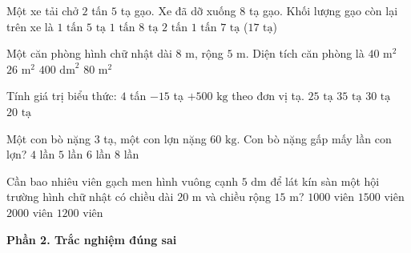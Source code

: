 \begin{ex} %
Một xe tải chở $2$ tấn $5$ tạ gạo. Xe đã dỡ xuống $8$ tạ gạo. Khối lượng gạo còn lại trên xe là
\choice
{$1\text{ tấn } 5\text{ tạ}$}
{$1\text{ tấn } 8\text{ tạ}$}
{$2\text{ tấn}$}
{\True $1\text{ tấn } 7\text{ tạ}$ ($17\text{ tạ}$)}
\end{ex}

\begin{ex} %
Một căn phòng hình chữ nhật dài $8\text{ m}$, rộng $5\text{ m}$. Diện tích căn phòng là
\choice
{\True $40\text{ m}^2$}
{$26\text{ m}^2$}
{$400\text{ dm}^2$}
{$80\text{ m}^2$}
\end{ex}

\begin{ex} %
Tính giá trị biểu thức: $4$ tấn $- 15$ tạ $+ 500\text{ kg}$ theo đơn vị tạ.
\choice
{$25\text{ tạ}$}
{$35\text{ tạ}$}
{\True $30\text{ tạ}$}
{$20\text{ tạ}$}
\end{ex}

\begin{ex} %
Một con bò nặng $3$ tạ, một con lợn nặng $60\text{ kg}$. Con bò nặng gấp mấy lần con lợn?
\choice
{$4$ lần}
{\True $5$ lần}
{$6$ lần}
{$8$ lần}
\end{ex}

\begin{ex} %
Cần bao nhiêu viên gạch men hình vuông cạnh $5\text{ dm}$ để lát kín sàn một hội trường hình chữ nhật có chiều dài $20\text{ m}$ và chiều rộng $15\text{ m}$?
\choice
{$1000$ viên}
{$1500$ viên}
{$2000$ viên}
{\True $1200$ viên}
\end{ex}

\textbf{Phần 2. Trắc nghiệm đúng sai}

